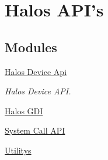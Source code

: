 \hypertarget{group___a_p_i}{
\section{Halos API's}
\label{group___a_p_i}
}
\subsection*{Modules}
\begin{CompactItemize}
\item 
\hyperlink{group___d_e_v_i_c_e___a_p_i}{Halos Device Api}
\begin{CompactList}\small\item\em Halos Device API. \item\end{CompactList}

\item 
\hyperlink{group___g_d_i}{Halos GDI}
\item 
\hyperlink{group___s_y_s_t_e_m___c_a_l_l___a_p_i}{System Call API}
\item 
\hyperlink{group___u_t_i_l}{Utilitys}
\end{CompactItemize}
